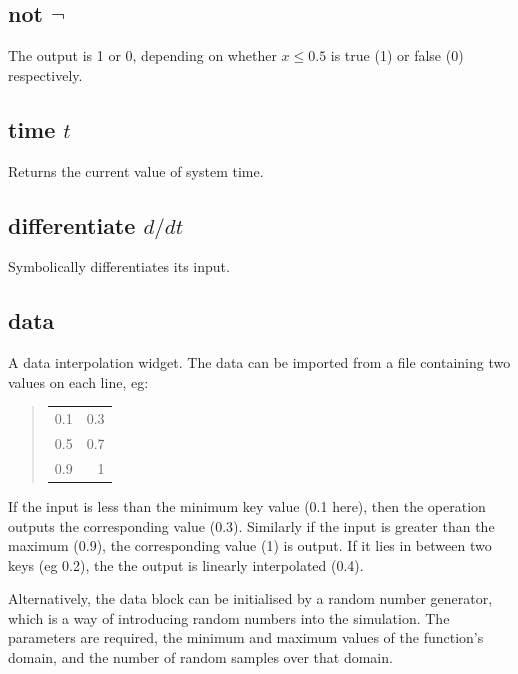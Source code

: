 \subsection{not $\neg$}\label{Operation:not_} The output is 1 or 0, depending
  on whether $x\le0.5$ is true (1) or false (0) respectively.

\subsection{time $t$}\label{Operation:time}  Returns the current value of system time.

\subsection{differentiate $d/dt$}\label{Operation:differentiate}
Symbolically differentiates its input.

\subsection{data }\label{Operation:data}  A data interpolation
widget. The data can be imported from a file containing
two values on each line, eg:
\begin{quote}
\begin{tabular}{rr}
0.1 &0.3\\
0.5 &0.7\\
0.9 &1\\
\end{tabular}
\end{quote}

If the input is less than the minimum key value (0.1 here), then the
operation outputs the corresponding value (0.3). Similarly if the
input is greater than the maximum (0.9), the corresponding value (1)
is output. If it lies in between two keys (eg 0.2), the the output is
linearly interpolated (0.4).

Alternatively, the data block can be initialised by a random number
generator, which is a way of introducing random numbers into the simulation. The parameters are required, the
minimum and maximum values of the function's domain, and the number of
random samples over that domain.

